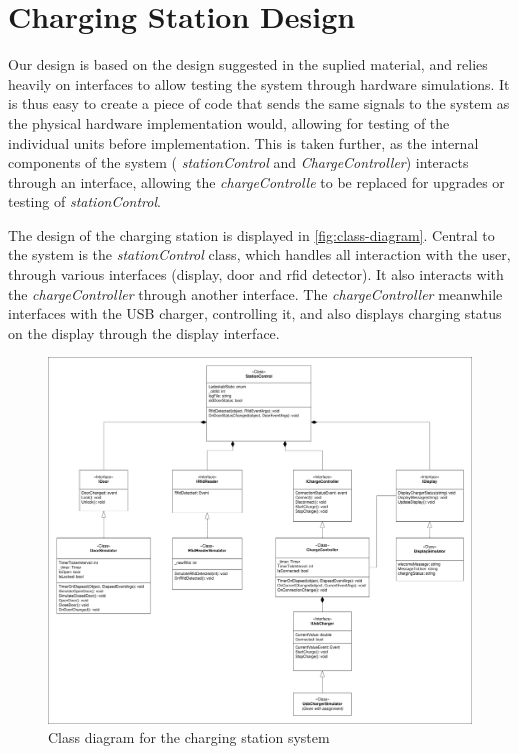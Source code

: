 \section{Charging Station Design}

Our design is based on the design suggested in the suplied material, and relies heavily on interfaces to allow testing the system through hardware simulations. It is thus easy to create a piece of code that sends the same signals to the system as the physical hardware implementation would, allowing for testing of the individual units before implementation. This is taken further, as the internal components of the system ( \textit{stationControl} and \textit{ChargeController}) interacts through an interface, allowing the \textit{chargeControlle} to be replaced for upgrades or testing of \textit{stationControl}.

\vspace{3em}

The design of the charging station is displayed in \autoref{fig:class-diagram}. Central to the system is the \textit{stationControl} class, which handles all interaction with the user, through various interfaces (display, door and rfid detector). It also interacts with the \textit{chargeController} through another interface. The \textit{chargeController} meanwhile interfaces with the USB charger, controlling it, and also displays charging status on the display through the display interface. 

\begin{figure}[h]
  \centering
  \includegraphics[width=\textwidth]{02-Body/images/ChargingStation_classDiagram.pdf}
  \caption{Class diagram for the charging station system}
  \label{fig:class-diagram}
\end{figure}

